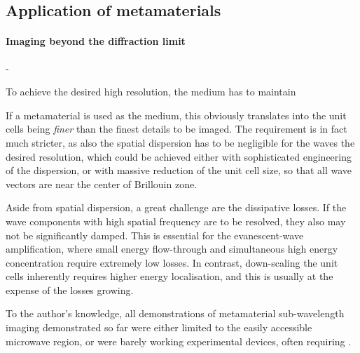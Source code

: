 \subsection{Application of metamaterials} 
\paragraph{Imaging beyond the diffraction limit }%
- 


To achieve the desired high resolution, the medium has to maintain  \todo{+}

If a metamaterial is used as the medium, this obviously translates into the unit cells being \textit{finer} than the finest details to be imaged. The requirement is in fact much stricter, as also the spatial dispersion has to be negligible for the waves the desired resolution, which could be achieved either with sophisticated engineering of the dispersion, or with massive reduction of the unit cell size, so that all wave vectors are near the center of Brillouin zone. %

Aside from spatial dispersion, a great challenge are the dissipative losses. If the wave components with high spatial frequency are to be resolved, they also may not be significantly damped. This is essential for the evanescent-wave amplification, where small energy flow-through and simultaneous high energy concentration require extremely low losses. In contrast, down-scaling the unit cells inherently requires higher energy localisation, and this is usually at the expense of the losses growing.

To the author's knowledge, all demonstrations of metamaterial sub-wavelength imaging demonstrated so far were either limited to the easily accessible microwave %
region, or were barely working experimental devices, often requiring .

